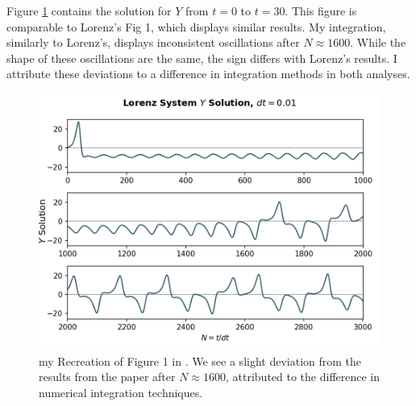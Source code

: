 \documentclass[linenumbers,trackchanges]{aastex7}
\begin{document}
Figure \ref{q2p3} contains the solution for $Y$ from $t = 0$ to $t = 30$. This figure is comparable to Lorenz's Fig 1, which displays similar results. My integration, similarly to Lorenz's, displays inconsistent oscillations after $N \approx 1600$. While the shape of these oscillations are the same, the sign differs with Lorenz's results. I attribute these deviations to a difference in integration methods in both analyses.
\begin{figure}[h!]
     \includegraphics{figures/q3p3.png}
     \caption{my Recreation of Figure 1 in \citet{lorenz_deterministic_1963}. We see a slight deviation from the results from the paper after $N \approx 1600$, attributed to the difference in numerical integration techniques. }
     \label{q2p3}
\end{figure}
\end{document}
